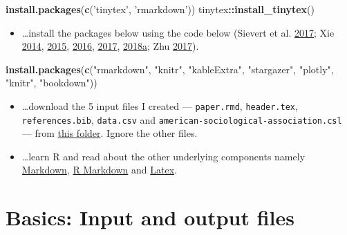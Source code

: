 \documentclass[
  12pt,
]{article}
\newenvironment{Shaded}{\begin{snugshade}}{\end{snugshade}}
\newcommand{\KeywordTok}[1]{\textcolor[rgb]{0.13,0.29,0.53}{\textbf{#1}}}
\newcommand{\NormalTok}[1]{#1}
\newcommand{\OperatorTok}[1]{\textcolor[rgb]{0.81,0.36,0.00}{\textbf{#1}}}
\newcommand{\StringTok}[1]{\textcolor[rgb]{0.31,0.60,0.02}{#1}}
\providecommand{\tightlist}{%
  \setlength{\itemsep}{0pt}\setlength{\parskip}{0pt}}
\begin{document}
\begin{Shaded}
\begin{Highlighting}[]
\KeywordTok{install.packages}\NormalTok{(}\KeywordTok{c}\NormalTok{(}\StringTok{'tinytex'}\NormalTok{, }\StringTok{'rmarkdown'}\NormalTok{))}
\NormalTok{tinytex}\OperatorTok{::}\KeywordTok{install_tinytex}\NormalTok{()}
\end{Highlighting}
\end{Shaded}

\begin{itemize}
\tightlist
\item
  \ldots install the packages below using the code below (Sievert et al. \protect\hyperlink{ref-plotly}{2017}; Xie \protect\hyperlink{ref-knitr3}{2014}, \protect\hyperlink{ref-knitr2}{2015}, \protect\hyperlink{ref-bookdown2}{2016}, \protect\hyperlink{ref-bookdown1}{2017}, \protect\hyperlink{ref-knitr1}{2018}\protect\hyperlink{ref-knitr1}{a}; Zhu \protect\hyperlink{ref-kableextra}{2017}).
\end{itemize}

\begin{Shaded}
\begin{Highlighting}[]
\KeywordTok{install.packages}\NormalTok{(}\KeywordTok{c}\NormalTok{(}\StringTok{"rmarkdown"}\NormalTok{, }\StringTok{"knitr"}\NormalTok{, }\StringTok{"kableExtra"}\NormalTok{,}
                   \StringTok{"stargazer"}\NormalTok{, }\StringTok{"plotly"}\NormalTok{, }\StringTok{"knitr"}\NormalTok{,}
                   \StringTok{"bookdown"}\NormalTok{))}
\end{Highlighting}
\end{Shaded}

\begin{itemize}
\item
  \ldots download the 5 input files I created --- \texttt{paper.rmd}, \texttt{header.tex}, \texttt{references.bib}, \texttt{data.csv} and \texttt{american-sociological-association.csl} --- from \href{https://drive.google.com/drive/folders/1zJP3cNPrHN-gj0rcmbHQgg-XA0hqDXdd?usp=sharing}{this folder}. Ignore the other files.
\item
  \ldots learn R and read about the other underlying components namely \href{https://en.wikipedia.org/wiki/Markdown}{Markdown}, \href{https://rmarkdown.rstudio.com/lesson-1.html}{R Markdown} and \href{https://en.wikipedia.org/wiki/LaTeX}{Latex}.
\end{itemize}

\hypertarget{basics-input-and-output-files}{%
\section{Basics: Input and output files}\label{basics-input-and-output-files}}
\end{document}
